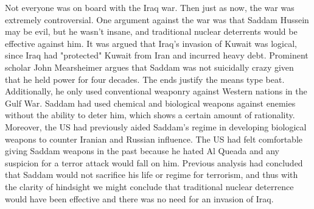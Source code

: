 \documentclass[nobib]{tufte-handout}
\begin{document}
Not everyone was on board with the Iraq war. Then just as now, 
the war was extremely controversial. One argument against 
the war was that Saddam Hussein may be evil, but he wasn't insane, 
and traditional nuclear deterrents would be effective against him. 
It was argued that Iraq's invasion of Kuwait 
was logical, since Iraq had "protected" Kuwait 
from Iran and incurred heavy debt. Prominent scholar 
John Mearsheimer argues that Saddam was not 
suicidally crazy given that he held power for four 
decades. The ends justify the means type beat. 
Additionally, he only used conventional weaponry 
against Western nations in the Gulf War. Saddam had 
used chemical and biological weapons against enemies 
without the ability to deter him, which shows a 
certain amount of rationality. Moreover, the US had previously 
aided Saddam's regime in developing biological 
weapons to counter Iranian and Russian influence. 
The US had felt comfortable giving Saddam weapons 
in the past because he hated Al Queada and any 
suspicion for a terror attack would fall on him. 
Previous analysis had concluded that Saddam would 
not sacrifice his life or regime for terrorism, 
and thus with the clarity of hindsight we might 
conclude that traditional nuclear deterrence would 
have been effective and there was no need for an
invasion of Iraq. 
\end{document}
